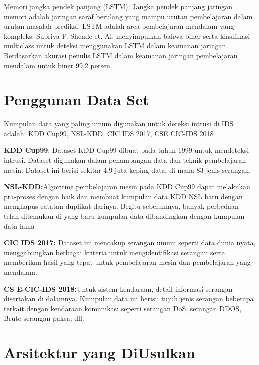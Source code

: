 \documentclass[conference]{IEEEtran}
\begin{document}
Memori jangka pendek panjang (LSTM): Jangka pendek panjang
jaringan memori adalah jaringan saraf berulang yang mampu
urutan pembelajaran dalam urutan masalah prediksi. LSTM adalah
area pembelajaran mendalam yang kompleks. Supriya P. Shende et. Al. \cite{yong2019intrusion}
menyimpulkan bahwa biner serta klasifikasi multiclass
untuk deteksi menggunakan LSTM dalam keamanan jaringan. Berdasarkan
akurasi penulis LSTM dalam keamanan jaringan pembelajaran mendalam
untuk biner 99,2 persen

\section{Penggunan Data Set}
Kumpulan data yang paling umum digunakan untuk deteksi intrusi
di IDS adalah: KDD Cup99, NSL-KDD, CIC IDS 2017, CSE CIC-IDS 2018

\textbf{KDD Cup99}: Dataset KDD Cup99 dibuat pada tahun 1999
untuk mendeteksi intrusi. Dataset digunakan dalam penambangan data dan
teknik pembelajaran mesin. Dataset ini berisi sekitar 4.9
juta keping data, di mana 83%
jenis serangan.

\textbf{NSL-KDD:}Algoritme pembelajaran mesin pada KDD Cup99 dapat melakukan pra-proses dengan baik dan membuat kumpulan data KDD NSL baru dengan menghapus catatan duplikat darinya. Begitu
sebelumnya, banyak perbedaan telah ditemukan di yang baru
kumpulan data dibandingkan dengan kumpulan data lama


\textbf{CIC IDS 2017:} Dataset ini mencakup serangan umum seperti
data dunia nyata, menggabungkan berbagai kriteria untuk mengidentifikasi serangan serta memberikan hasil yang tepat untuk pembelajaran mesin
dan pembelajaran yang mendalam.

\textbf{CS E-CIC-IDS 2018:}Untuk sistem kendaraan, detail
informasi serangan disertakan di dalamnya. Kumpulan data ini berisi:
tujuh jenis serangan beberapa terkait dengan kendaraan
komunikasi seperti serangan DoS, serangan DDOS, Brute
serangan paksa, dll.

\section{Arsitektur yang DiUsulkan}
\end{document}
